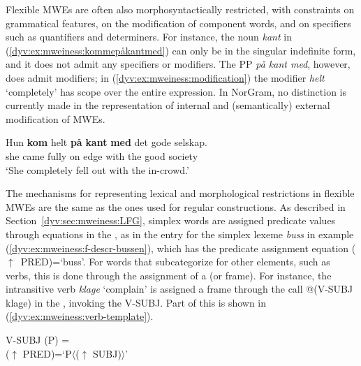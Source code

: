 \documentclass[output=paper]{langsci/langscibook}
\begin{document}
Flexible MWEs are often also morphosyntactically restricted, with constraints on grammatical features, on the modification of component words, and on specifiers such as quantifiers and determiners.
For instance, the noun \emph{kant} in (\ref{dyv:ex:mweiness:kommepåkantmed}) can only be in the singular indefinite form, and it does not admit any specifiers or modifiers.
The PP \emph{på kant med}, however, does admit modifiers; in (\ref{dyv:ex:mweiness:modification}) the modifier \emph{helt} `completely' has scope over the entire expression.
In NorGram, no distinction is currently made in the representation of internal and (semantically) external modification of MWEs. 

\ea\label{dyv:ex:mweiness:modification}
\gll Hun \textbf{kom} helt \textbf{på} \textbf{kant} \textbf{med} det gode selskap. \\
she came fully on edge with the good society \\
\glt `She completely fell out with the in-crowd.' \\
\z

The mechanisms for representing lexical and morphological restrictions in flexible MWEs are the same as the ones used for regular constructions.
As described in Section~\ref{dyv:sec:mweiness:LFG}, simplex words are assigned predicate values through equations in the , as in the entry for the simplex lexeme \emph{buss} in example (\ref{dyv:ex:mweiness:f-descr-bussen}), which has the predicate assignment equation ($\uparrow$~PRED)=`buss'. 
For words that subcategorize for other elements, such as verbs, this is done through the assignment of a  (or  frame). 
For instance, the intransitive verb \emph{klage} `complain' is assigned a frame through the  call @(V-SUBJ klage) in the , invoking the  V-SUBJ. 
Part of this  is shown in (\ref{dyv:ex:mweiness:verb-template}).

\ea\label{dyv:ex:mweiness:verb-template}
{\small 
 V-SUBJ (P) = \\
\hspace{2em} ($\uparrow$ PRED)=`P$\langle$($\uparrow$ SUBJ)$\rangle$' \\
}
\z
\end{document}
